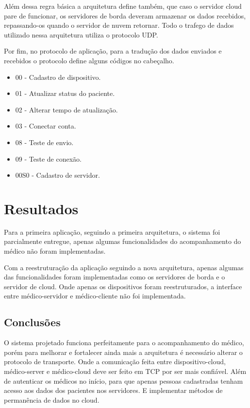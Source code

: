 \documentclass[12pt]{article}
\begin{document}
Além dessa regra básica a arquitetura define também, que caso o servidor cloud pare de funcionar, os servidores de borda deveram armazenar os dados recebidos, repassando-os quando o servidor de nuvem retornar. Todo o trafego de dados utilizado nessa arquitetura utiliza o protocolo UDP.

Por fim, no protocolo de aplicação, para a tradução dos dados enviados e recebidos o protocolo define alguns códigos no cabeçalho.

\begin{itemize}
\item 00 - Cadastro de dispositivo.
\item 01 - Atualizar status do paciente.
\item 02 - Alterar tempo de atualização.
\item 03 - Conectar conta.
\item 08 - Teste de envio.
\item 09 - Teste de conexão.
\item 00S0 - Cadastro de servidor.
\end{itemize}

\section{Resultados}

Para a primeira aplicação, seguindo a primeira arquitetura, o sistema foi parcialmente entregue, apenas algumas funcionalidades do acompanhamento do médico não foram implementadas.

Com a reestruturação da aplicação seguindo a nova arquitetura, apenas algumas das funcionalidades foram implementadas como os servidores de borda e o servidor de cloud. Onde apenas os dispositivos foram reestruturados, a interface entre médico-servidor e médico-cliente não foi implementada.

\subsection{Conclusões}

O sistema projetado funciona perfeitamente para o acompanhamento do médico, porém para melhorar e fortalecer ainda mais a arquitetura é necessário alterar o protocolo de transporte. Onde a comunicação feita entre dispositivo-cloud, médico-server e médico-cloud deve ser feito em TCP por ser mais confiável. Além de autenticar os médicos no início, para que apenas pessoas cadastradas tenham acesso aos dados dos pacientes nos servidores. E implementar métodos de permanência de dados no cloud.



\end{document}
